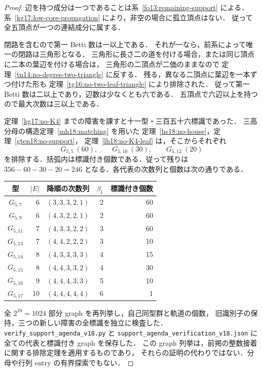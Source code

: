 \begin{proof}
辺を持つ成分は一つであることは系~\ref{fo13:remaining-support} による．
系~\ref{kg17:low-core-propagation} により，非空の場合に孤立頂点はない．
従って全五頂点が一つの連結成分に属する．

閉路を含むので第一 Betti 数は一以上である．
それが一なら，前系によって唯一の閉路は三角形となる．
三角形に長さ二の道を付ける場合，または同じ頂点に二本の葉辺を付ける場合は，
三角形の二頂点が二価のままなので
定理~\ref{tn14:no-degree-two-triangle} に反する．
残る，異なる二頂点に葉辺を一本ずつ付けた形も
定理~\ref{tg16:no-two-leaf-triangle} により排除された．
従って第一 Betti 数は二以上であり，辺数は少なくとも六である．
五頂点で六辺以上を持つので最大次数は三以上である．

定理~\ref{kg17:no-K4} までの障害を課すと十一型・三百五十六標識であった．
三高分母の構造定理~\ref{mh18:matching} を用いた
定理~\ref{hs18:no-house}，定理~\ref{gten18:no-support}，
定理~\ref{lh18:no-K4-leaf} は，そこからそれぞれ
\[
 G_{5,5}\ (60),\qquad G_{5,10}\ (30),\qquad G_{5,12}\ (20)
\]
を排除する．括弧内は標識付き個数である．従って残りは
$356-60-30-20=246$ となる．各代表の次数列と個数は次の通りである．
\begin{center}
\small
\begin{tabular}{crcrr}
 型&$|E|$&降順の次数列&$\beta_1$&標識付き個数\\\hline
 $G_{5,7}$&6&$(3,3,3,2,1)$&2&60\\
 $G_{5,9}$&6&$(4,3,2,2,1)$&2&60\\
 $G_{5,11}$&7&$(4,3,3,2,2)$&3&60\\
 $G_{5,13}$&7&$(4,4,2,2,2)$&3&10\\
 $G_{5,14}$&8&$(4,3,3,3,3)$&4&15\\
 $G_{5,15}$&8&$(4,4,3,3,2)$&4&30\\
 $G_{5,16}$&9&$(4,4,4,3,3)$&5&10\\
 $G_{5,17}$&10&$(4,4,4,4,4)$&6&1
\end{tabular}
\end{center}

全 $2^{10}=1024$ 部分 graph を再列挙し，自己同型群と軌道の個数，
旧識別子の保持，三つの新しい障害の全標識を独立に検査した．
\nolinkurl{verify_support_agenda_v18.py} と
\nolinkurl{support_agenda_verification_v18.json} に全ての代表と標識付き graph を保存した．
この graph 列挙は，前掲の整数接着に関する排除定理を適用するものであり，
それらの証明の代わりではない．分母や行列 entry の有界探索でもない．
\end{proof}

